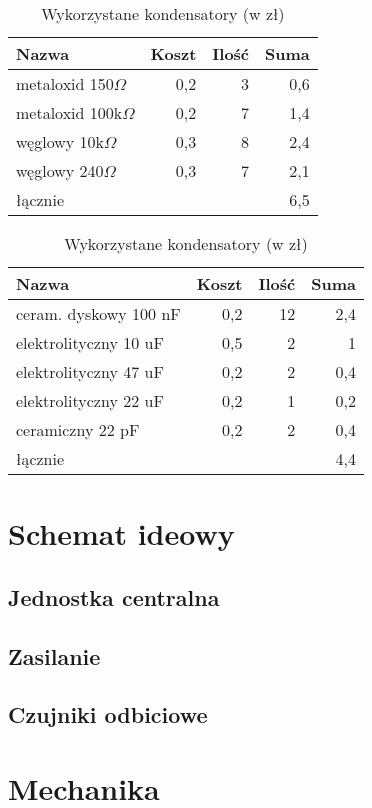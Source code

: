 \documentclass{article}
\begin{document}
\begin{table}[!htbp]
\centering
\caption{Wykorzystane rezystory (w zł)}
\begin{tabular}{l|r|r|r}
Nazwa          & Koszt & Ilość & Suma \\
\hline
metaloxid 150$\Omega$  & 0,2 & 3 & 0,6 \\
metaloxid 100k$\Omega$  & 0,2 & 7 & 1,4 \\
węglowy 10k$\Omega$     & 0,3 & 8 & 2,4 \\
węglowy 240$\Omega$     & 0,3 & 7 & 2,1 \\
\hline
łącznie           &     &   & 6,5
\end{tabular}

\caption{Wykorzystane kondensatory (w zł)}
\begin{tabular}{l|r|r|r}
Nazwa          & Koszt & Ilość & Suma \\
\hline
ceram. dyskowy 100 nF & 0,2 & 12 & 2,4 \\
elektrolityczny 10 uF & 0,5 & 2  & 1   \\
elektrolityczny 47 uF & 0,2 & 2  & 0,4 \\
elektrolityczny 22 uF & 0,2 & 1  & 0,2 \\
ceramiczny 22 pF      & 0,2 & 2  & 0,4 \\
\hline
łącznie                &     & & 4,4
\end{tabular}
\end{table}

\section{Schemat ideowy}

\subsection{Jednostka centralna}


\subsection{Zasilanie}


\subsection{Czujniki odbiciowe}


\section{Mechanika}
\end{document}
